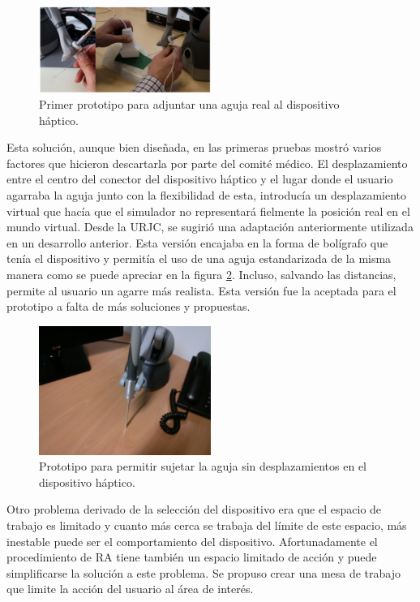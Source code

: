 \begin{figure}[h]
    \centering
    \includegraphics[width=0.5\textwidth]{IMG/needle.PNG}
    \caption{Primer prototipo para adjuntar una aguja real al dispositivo háptico.}
    \label{fig:needle}
\end{figure}

Esta solución, aunque bien diseñada, en las primeras pruebas mostró varios factores que hicieron descartarla por parte del comité médico. El desplazamiento entre el centro del conector del dispositivo háptico y el lugar donde el usuario agarraba la aguja junto con la flexibilidad de esta, introducía un desplazamiento virtual que hacía que el simulador no representará fielmente la posición real en el mundo virtual. Desde la \ac{URJC}, se sugirió una adaptación  anteriormente utilizada en un desarrollo anterior\cite{phantompen}. Esta versión encajaba en la forma de bolígrafo que tenía el dispositivo y permitía el uso de una aguja estandarizada de la misma manera como se puede apreciar en la figura \ref{fig:needle2}. Incluso, salvando las distancias, permite al usuario un agarre más realista. Esta versión fue la aceptada para el prototipo a falta de más soluciones y propuestas.


\begin{figure}[h]
    \centering
    \includegraphics[width=0.5\textwidth]{IMG/needle2.jpg}
    \caption{Prototipo para permitir sujetar la aguja sin desplazamientos en el dispositivo háptico.}
    \label{fig:needle2}
\end{figure}



Otro problema derivado de la selección del dispositivo era que el espacio de trabajo es limitado y cuanto más cerca se trabaja del límite de este espacio, más inestable puede ser el comportamiento del dispositivo. Afortunadamente el procedimiento de \ac{RA} tiene también un espacio limitado de acción y puede simplificarse la solución a este problema. Se propuso crear una mesa de trabajo que limite la acción del usuario al área de interés. 








